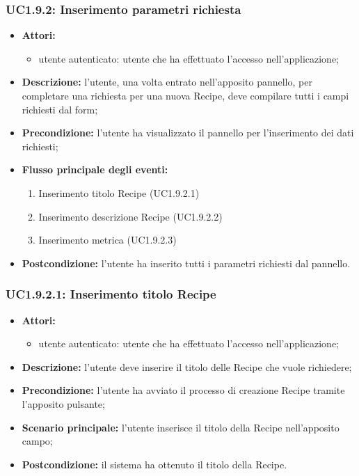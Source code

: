 \subsubsection{UC1.9.2: Inserimento parametri richiesta}
\begin{itemize}
	\item \textbf{Attori:}
	\begin{itemize}
		\item utente autenticato: utente che ha effettuato l'accesso nell'applicazione;
	\end{itemize}
	\item \textbf{Descrizione:} l'utente, una volta entrato nell'apposito pannello, per completare una richiesta per una nuova Recipe, deve compilare tutti i campi richiesti dal form;
	\item \textbf{Precondizione:} l'utente ha visualizzato il pannello per l'inserimento dei dati richiesti;
	\item \textbf{Flusso principale degli eventi:}
	\begin{enumerate}
		\item Inserimento titolo Recipe (UC1.9.2.1)
		\item Inserimento descrizione Recipe (UC1.9.2.2)
		\item Inserimento metrica (UC1.9.2.3)
	\end{enumerate}
	\item \textbf{Postcondizione:} l'utente ha inserito tutti i parametri richiesti dal pannello.
\end{itemize}

\subsubsection{UC1.9.2.1: Inserimento titolo Recipe}
\begin{itemize}
	\item \textbf{Attori:}
	\begin{itemize}
		\item utente autenticato: utente che ha effettuato l'accesso nell'applicazione;
	\end{itemize}
	\item \textbf{Descrizione:} l'utente deve inserire il titolo delle Recipe che vuole richiedere;
	\item \textbf{Precondizione:} l'utente ha avviato il processo di creazione Recipe tramite l'apposito pulsante;
	\item \textbf{Scenario principale:} l'utente inserisce il titolo della Recipe nell'apposito campo;
	\item \textbf{Postcondizione:} il sistema ha ottenuto il titolo della Recipe.
\end{itemize}

